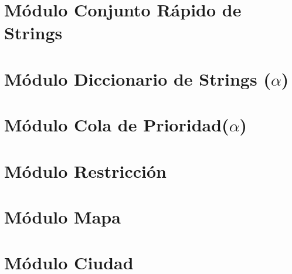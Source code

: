 \documentclass[a4paper,titlepage]{article}
\begin{document}


\section{Módulo Conjunto Rápido de Strings}



\section{Módulo Diccionario de Strings ($\alpha$)}



\section{Módulo Cola de Prioridad($\alpha$)}



\section{Módulo Restricción}



\section{Módulo Mapa}



\section{Módulo Ciudad}


\end{document}

